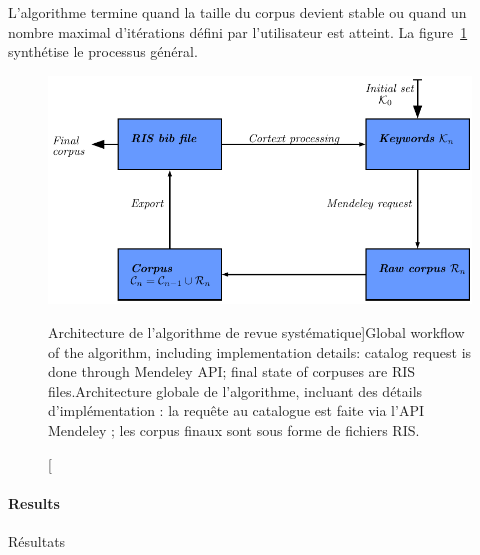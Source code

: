 {L'algorithme termine quand la taille du corpus devient stable ou quand un nombre maximal d'itérations défini par l'utilisateur est atteint. La figure~\ref{fig:quantepistemo:algo} synthétise le processus général.
}


\begin{figure}
\centering
\includegraphics[width=\textwidth]{Figures/QuantEpistemo/schema_algo}
\caption[Systematic review algorithm workflow][Architecture de l'algorithme de revue systématique]{Global workflow of the algorithm, including implementation details: catalog request is done through Mendeley API; final state of corpuses are RIS files.}{Architecture globale de l'algorithme, incluant des détails d'implémentation : la requête au catalogue est faite via l'API Mendeley ; les corpus finaux sont sous forme de fichiers RIS.}
\label{fig:quantepistemo:algo}
\end{figure}



\paragraph{Results}{Résultats}



